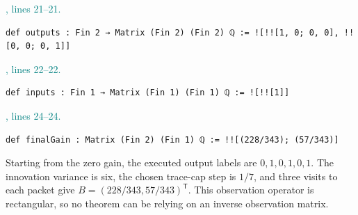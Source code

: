 \documentclass[11pt]{article}\usepackage{needspace}\renewcommand{\paperkind}{Lean companion}\setlength{\parskip}{0.35em}
\begin{document}


{\small\textcolor{teal}{, lines 21--21.}\par}

\begin{lstlisting}[style=BayesSource]
def outputs : Fin 2 → Matrix (Fin 2) (Fin 2) ℚ := ![!![1, 0; 0, 0], !![0, 0; 0, 1]]
\end{lstlisting}



{\small\textcolor{teal}{, lines 22--22.}\par}

\begin{lstlisting}[style=BayesSource]
def inputs : Fin 1 → Matrix (Fin 1) (Fin 1) ℚ := ![!![1]]
\end{lstlisting}



{\small\textcolor{teal}{, lines 24--24.}\par}

\begin{lstlisting}[style=BayesSource]
def finalGain : Matrix (Fin 2) (Fin 1) ℚ := !![(228/343); (57/343)]
\end{lstlisting}

Starting from the zero gain, the executed output labels are $0,1,0,1,0,1$. The innovation variance is six, the chosen trace-cap step is $1/7$, and three visits to each packet give $B=(228/343,57/343)^{\mathsf T}$. This observation operator is rectangular, so no theorem can be relying on an inverse observation matrix.
\end{document}
